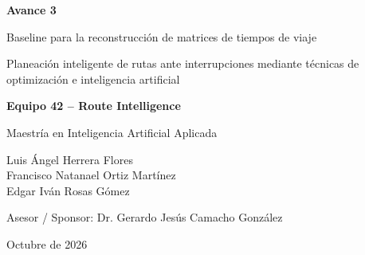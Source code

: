 \documentclass[11pt]{article}
\begin{document}
\begin{titlepage}
    \centering

    \vspace*{2.0cm}

    {\large\bfseries
    Avance 3
    \par}

    \vspace{0.6cm}

    {\LARGE\bfseries
    \parbox{0.88\textwidth}{
        \centering
        Baseline para la reconstrucción de matrices de tiempos de viaje
    }
    \par}

    \vspace{1.2cm}

    {\large
    \parbox{0.88\textwidth}{
        \centering
        Planeación inteligente de rutas ante interrupciones mediante técnicas de optimización e inteligencia artificial
    }
    \par}

    \vspace{1.5cm}

    {\large\bfseries
    Equipo 42 -- Route Intelligence
    \par}

    \vspace{0.35cm}

    {\normalsize
    Maestría en Inteligencia Artificial Aplicada
    \par}

    \vspace{1.5cm}

    {\normalsize
    Luis Ángel Herrera Flores\\[0.25cm]
    Francisco Natanael Ortiz Martínez\\[0.25cm]
    Edgar Iván Rosas Gómez
    \par}

    \vspace{1.2cm}

    {\normalsize
    Asesor / Sponsor: Dr. Gerardo Jesús Camacho González
    \par}

    \vfill

    {\normalsize
    Octubre de 2026
    \par}

\end{titlepage}
\end{document}
